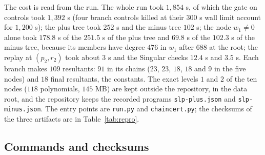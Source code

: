 \documentclass[11pt]{article}
\theoremstyle{remark}
\begin{document}
The cost is read from the run. The whole run took $1{,}854$ s, of which the gate on controls took $1{,}392$ s (four branch controls killed at their $300$ s wall limit account for $1{,}200$ s); the plus tree took $252$ s and the minus tree $102$ s; the node $w_1\ne0$ alone took $178.8$ s of the $251.5$ s of the plus tree
and $69.8$ s of the $102.3$ s of the minus tree, because its members have degree $476$ in $w_1$ after $688$ at the root; the replay at $(p_2,r_2)$ took about $3$ s and the Singular checks $12.4$ s and $3.5$ s. Each branch makes $109$ resultants: $91$ in its chains ($23$, $23$, $18$, $18$ and $9$ in the five nodes) and $18$ final resultants, the constants. The exact levels $1$ and $2$ of the ten nodes ($118$ polynomials, $145$ MB) are kept outside the repository, in the data root,
and the repository keeps the recorded programs \texttt{slp-plus.json} and \texttt{slp-minus.json}. The entry points are \texttt{run.py} and \texttt{chaincert.py}; the checksums of the three artifacts are in Table~\ref{tab:repro}.

\subsection{Commands and checksums}
\end{document}
